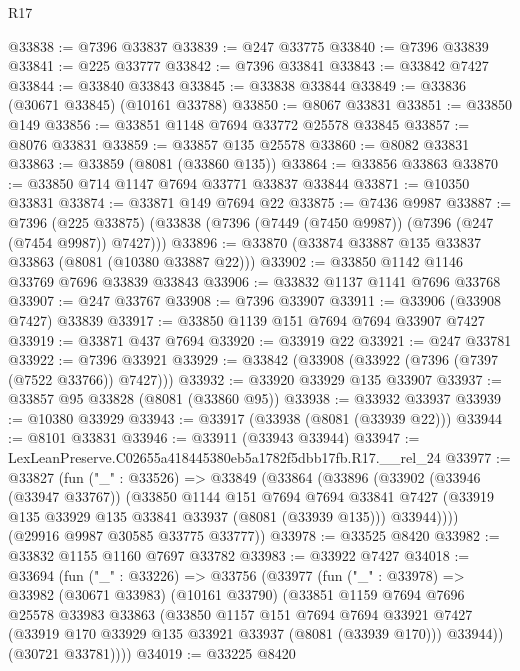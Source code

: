 \begin{lexlean}{R17}
\begin{coremodule}
@33838 := @7396 @33837
@33839 := @247 @33775
@33840 := @7396 @33839
@33841 := @225 @33777
@33842 := @7396 @33841
@33843 := @33842 @7427
@33844 := @33840 @33843
@33845 := @33838 @33844
@33849 := @33836 (@30671 @33845) (@10161 @33788)
@33850 := @8067 @33831
@33851 := @33850 @149
@33856 := @33851 @1148 @7694 @33772 @25578 @33845
@33857 := @8076 @33831
@33859 := @33857 @135 @25578
@33860 := @8082 @33831
@33863 := @33859 (@8081 (@33860 @135))
@33864 := @33856 @33863
@33870 := @33850 @714 @1147 @7694 @33771 @33837 @33844
@33871 := @10350 @33831
@33874 := @33871 @149 @7694 @22
@33875 := @7436 @9987
@33887 := @7396
    (@225 @33875)
    (@33838 (@7396 (@7449 (@7450 @9987)) (@7396 (@247 (@7454 @9987)) @7427)))
@33896 := @33870 (@33874 @33887 @135 @33837 @33863 (@8081 (@10380 @33887 @22)))
@33902 := @33850 @1142 @1146 @33769 @7696 @33839 @33843
@33906 := @33832 @1137 @1141 @7696 @33768
@33907 := @247 @33767
@33908 := @7396 @33907
@33911 := @33906 (@33908 @7427) @33839
@33917 := @33850 @1139 @151 @7694 @7694 @33907 @7427
@33919 := @33871 @437 @7694
@33920 := @33919 @22
@33921 := @247 @33781
@33922 := @7396 @33921
@33929 := @33842 (@33908 (@33922 (@7396 (@7397 (@7522 @33766)) @7427)))
@33932 := @33920 @33929 @135 @33907
@33937 := @33857 @95 @33828 (@8081 (@33860 @95))
@33938 := @33932 @33937
@33939 := @10380 @33929
@33943 := @33917 (@33938 (@8081 (@33939 @22)))
@33944 := @8101 @33831
@33946 := @33911 (@33943 @33944)
@33947 := LexLeanPreserve.C02655a418445380eb5a1782f5dbb17fb.R17.__rel_24
@33977 := @33827
    (fun ("_" : @33526) =>
    @33849
      (@33864
        (@33896
          (@33902
            (@33946 (@33947 @33767))
            (@33850
              @1144
              @151
              @7694
              @7694
              @33841
              @7427
              (@33919 @135 @33929 @135 @33841 @33937 (@8081 (@33939 @135)))
              @33944))))
      (@29916 @9987 @30585 @33775 @33777))
@33978 := @33525 @8420
@33982 := @33832 @1155 @1160 @7697 @33782
@33983 := @33922 @7427
@34018 := @33694
    (fun ("_" : @33226) =>
    @33756
      (@33977
        (fun ("_" : @33978) =>
        @33982
          (@30671 @33983)
          (@10161 @33790)
          (@33851
            @1159
            @7694
            @7696
            @25578
            @33983
            @33863
            (@33850
              @1157
              @151
              @7694
              @7694
              @33921
              @7427
              (@33919 @170 @33929 @135 @33921 @33937 (@8081 (@33939 @170)))
              @33944))
          (@30721 @33781))))
@34019 := @33225 @8420

\end{coremodule}
\end{lexlean}
